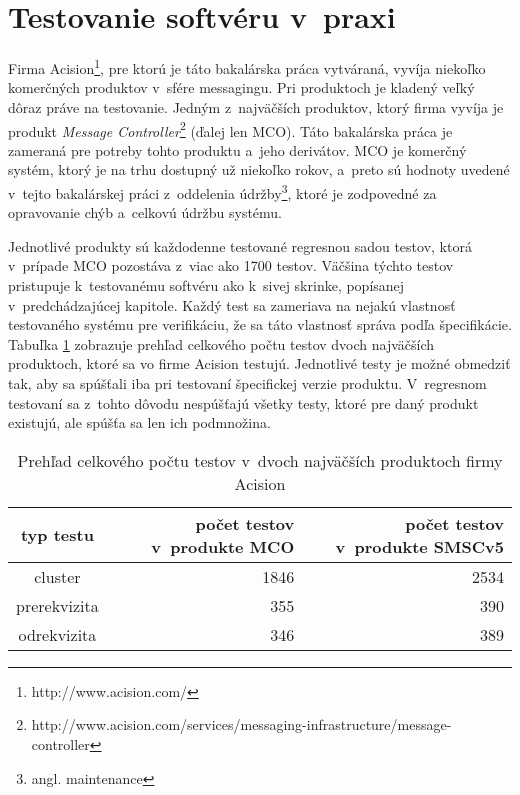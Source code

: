\section{Testovanie softvéru v~praxi} 
\label{sekcia:testovanie_v_praxi}
Firma Acision\footnote{http://www.acision.com/}, pre ktorú je táto 
bakalárska práca vytváraná, vyvíja niekoľko komerčných produktov
v~sfére messagingu. 
Pri produktoch je kladený veľký dôraz práve na testovanie.
Jedným z~najväčších produktov, ktorý firma vyvíja je produkt 
\textit{Message Controller}\footnote{http://www.acision.com/services/messaging-infrastructure/message-controller}
(ďalej len MCO).
Táto bakalárska práca je zameraná pre potreby tohto produktu a~jeho 
derivátov. MCO je komerčný systém, ktorý je na trhu dostupný už niekoľko 
rokov, a~preto sú hodnoty uvedené v~tejto bakalárskej práci z~oddelenia 
údržby\footnote{angl. maintenance}, ktoré je zodpovedné za opravovanie 
chýb a~celkovú údržbu systému.

Jednotlivé produkty sú každodenne testované regresnou 
sadou testov, ktorá v~prípade MCO pozostáva z~viac ako 1700 testov.
Väčšina týchto testov pristupuje k~testovanému softvéru ako k~sivej 
skrinke, popísanej v~predchádzajúcej kapitole.
Každý test sa zameriava na nejakú vlastnosť testovaného systému pre 
verifikáciu, že sa táto vlastnosť správa podľa špecifikácie.
Tabuľka \ref{tabulka:pocet_testov} zobrazuje prehľad celkového počtu 
testov dvoch najväčších produktoch, ktoré sa vo firme Acision testujú.
Jednotlivé testy je možné obmedziť tak, aby sa spúšťali iba pri testovaní
špecifickej verzie produktu. 
V~regresnom testovaní sa z~tohto dôvodu nespúšťajú všetky testy, 
ktoré pre daný produkt existujú, ale spúšťa sa len ich podmnožina.

\begin{table}
  \begin{center}
    \begin{tabular}{| c | r | r |}
    \hline
    typ testu & počet testov v~produkte MCO & počet testov v~produkte SMSCv5 \\ \hline
    cluster & 1846 & 2534 \\ \hline
    prerekvizita & 355 & 390 \\ \hline
    odrekvizita & 346 & 389 \\
    \hline
    \end{tabular}
    \caption{Prehľad celkového počtu testov v~dvoch najväčších 
             produktoch firmy Acision}
    \label{tabulka:pocet_testov}
  \end{center}
\end{table}

